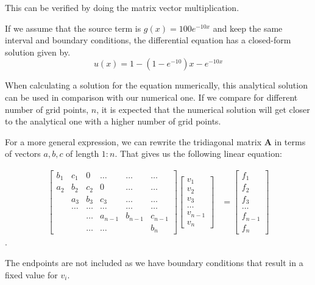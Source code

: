\documentclass[a4paper,norsk,12pt,oneside]{article}
\begin{document}
This can be verified by doing the matrix vector multiplication.

If we assume that the source term is \(g(x) = 100e^{-10x}\) and keep the
same interval and boundary conditions, the differential equation has a 
closed-form solution given by.
\begin{equation*}
    u(x) = 1-(1-e^{-10})x - e^{-10x}
\end{equation*} 

When calculating a solution for the equation numerically, this analytical
solution can be used in comparison with our numerical one. If we compare 
for different number of grid points, \(n\), it is expected that the numerical solution
will get closer to the analytical one with a higher number of grid points. 

For a more general expression, we can rewrite the
tridiagonal matrix \(\textbf{A}\) in terms of vectors
\(a, b, c\) of length \(1 : n\). That gives us the following linear equation:

\begin{align}\label{eq:general}
	\label{full eq Ax=f}	
	\begin{bmatrix}
		b_{1} & c_{1} & 0 & \hdots & \hdots & \hdots \\
		a_{2} & b_{2} & c_{2} & 0 & \hdots & \hdots \\
		& a_{3} & b_{3} & c_{3} & \hdots & \hdots \\
		& \hdots & \hdots & \hdots & \hdots & \hdots \\ 
		&& \hdots & a_{n-1} & b_{n-1} & c_{n-1} \\
		&& \hdots & \hdots &  & b_{n} 
	\end{bmatrix} \begin{bmatrix}
	v_1 \\ v_2 \\ v_3 \\ \hdots \\ v_{n-1} \\ v_n
	\end{bmatrix} &= \begin{bmatrix}
	f_1 \\ f_2 \\ f_3 \\ \hdots \\ f_{n-1} \\ f_n
	\end{bmatrix}
\end{align}. 

The endpoints are not included as we have boundary conditions that result in a fixed 
value for \(v_i\). 
\end{document}
